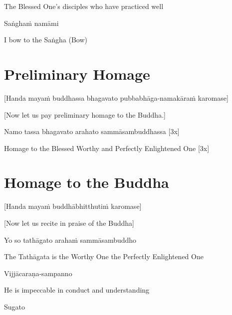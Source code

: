 \begin{english}
  The Blessed One’s disciples who have practiced well
\end{english}

Saṅghaṁ namāmi

\begin{english}
  I bow to the Saṅgha \hfill{(Bow)}
\end{english}

\section{Preliminary Homage}
\label{preliminary-homage}

\begin{center}
  [Handa mayaṁ buddhassa bhagavato pubbabhāga-namakāraṁ karomase]
\end{center}

\begin{center}
  [Now let us pay preliminary homage to the Buddha.]
\end{center}

Namo tassa bhagavato arahato sammāsambuddhassa \hfill{[3x]}

\begin{english}
  Homage to the Blessed Worthy and Perfectly Enlightened One [3x]
\end{english}

\section{Homage to the Buddha}
\label{homage-buddha}

\begin{center}
  [Handa mayaṁ buddhābhitthutiṁ karomase]
\end{center}
\begin{center}
  [Now let us recite in praise of the Buddha]
\end{center}

Yo so tathāgato arahaṁ sammāsambuddho

\begin{english}
  The Tathāgata is the Worthy One the Perfectly Enlightened One
\end{english}

Vijjācaraṇa-sampanno

\begin{english}
  He is impeccable in conduct and understanding
\end{english}

Sugato


